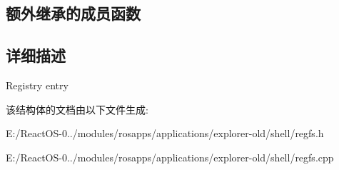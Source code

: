 \subsection*{额外继承的成员函数}


\subsection{详细描述}
Registry entry 

该结构体的文档由以下文件生成\+:\begin{DoxyCompactItemize}
\item 
E\+:/\+React\+O\+S-\/0../modules/rosapps/applications/explorer-\/old/shell/regfs.\+h\item 
E\+:/\+React\+O\+S-\/0../modules/rosapps/applications/explorer-\/old/shell/regfs.\+cpp\end{DoxyCompactItemize}
